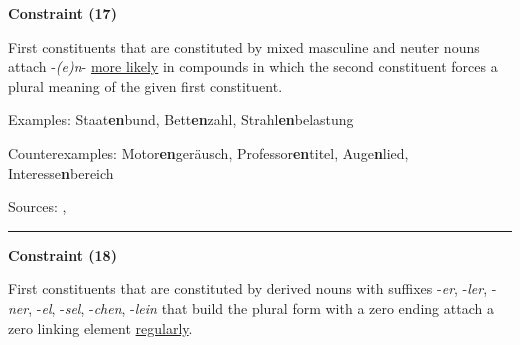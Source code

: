 \begin{center}
\textbf{Constraint (17)}
\end{center}

\noindent
First constituents that are constituted by mixed masculine and neuter nouns attach -\textit{(e)n}- \underline{more likely} in compounds in which the second constituent forces a plural meaning of the given first constituent.
\vspace{0.35em}


\vspace{0.3em}

\noindent
Examples: Staat\textbf{en}bund, Bett\textbf{en}zahl, Strahl\textbf{en}belastung

\noindent
Counterexamples: Motor\textbf{en}geräusch, Professor\textbf{en}titel, Auge\textbf{n}lied, Interesse\textbf{n}bereich

\vspace{0.3em}

\noindent
Sources: \citet[80]{nuebling_szczepaniak_2013}, \citet[92]{ortner_mueller-bollhagen_1991}


\hrule



\vspace{0.4em}

\begin{center}
\textbf{Constraint (18)}
\end{center}

\noindent
First constituents that are constituted by derived nouns with suffixes -\textit{er}, -\textit{ler}, -\textit{ner}, -\textit{el}, -\textit{sel}, -\textit{chen}, -\textit{lein} that build the plural form with a zero ending attach a zero linking element \underline{regularly}.
\vspace{0.35em}


